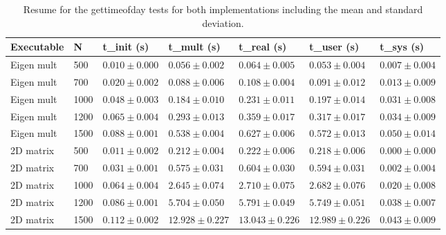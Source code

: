 \documentclass{article}
\begin{document}
    \begin{table}[h!]   
        \centering
        \begin{tabular}{|l|l|l|l|l|l|l|}    
            \hline
            \textbf{Executable} & \textbf{N} & \textbf{t\_init (s)} & \textbf{t\_mult (s)} & \textbf{t\_real (s)} & \textbf{t\_user (s)} & \textbf{t\_sys (s)} \\
            \hline
            Eigen mult    & 500   & \(0.010 \pm 0.000\) & \(0.056 \pm 0.002\) & \(0.064 \pm 0.005\) & \(0.053 \pm 0.004\) & \(0.007 \pm 0.004\) \\
            Eigen mult    & 700   & \(0.020 \pm 0.002\) & \(0.088 \pm 0.006\) & \(0.108 \pm 0.004\) & \(0.091 \pm 0.012\) & \(0.013 \pm 0.009\) \\
            Eigen mult    & 1000  & \(0.048 \pm 0.003\) & \(0.184 \pm 0.010\) & \(0.231 \pm 0.011\) & \(0.197 \pm 0.014\) & \(0.031 \pm 0.008\) \\
            Eigen mult    & 1200  & \(0.065 \pm 0.004\) & \(0.293 \pm 0.013\) & \(0.359 \pm 0.017\) & \(0.317 \pm 0.017\) & \(0.034 \pm 0.009\) \\
            Eigen mult    & 1500  & \(0.088 \pm 0.001\) & \(0.538 \pm 0.004\) & \(0.627 \pm 0.006\) & \(0.572 \pm 0.013\) & \(0.050 \pm 0.014\) \\
            \hline
            2D matrix     & 500   & \(0.011 \pm 0.002\) & \(0.212 \pm 0.004\) & \(0.222 \pm 0.006\) & \(0.218 \pm 0.006\) & \(0.000 \pm 0.000\) \\
            2D matrix     & 700   & \(0.031 \pm 0.001\) & \(0.575 \pm 0.031\) & \(0.604 \pm 0.030\) & \(0.594 \pm 0.031\) & \(0.002 \pm 0.004\) \\
            2D matrix     & 1000  & \(0.064 \pm 0.004\) & \(2.645 \pm 0.074\) & \(2.710 \pm 0.075\) & \(2.682 \pm 0.076\) & \(0.020 \pm 0.008\) \\
            2D matrix     & 1200  & \(0.086 \pm 0.001\) & \(5.704 \pm 0.050\) & \(5.791 \pm 0.049\) & \(5.749 \pm 0.051\) & \(0.038 \pm 0.007\) \\
            2D matrix     & 1500  & \(0.112 \pm 0.002\) & \(12.928 \pm 0.227\) & \(13.043 \pm 0.226\) & \(12.989 \pm 0.226\) & \(0.043 \pm 0.009\) \\
            \hline 
        \end{tabular}
        \caption{Resume for the gettimeofday tests for both implementations including the mean and standard deviation.}
        \label{tab:2}
    \end{table}
    \vspace{-0.5cm}  %
\end{document}

